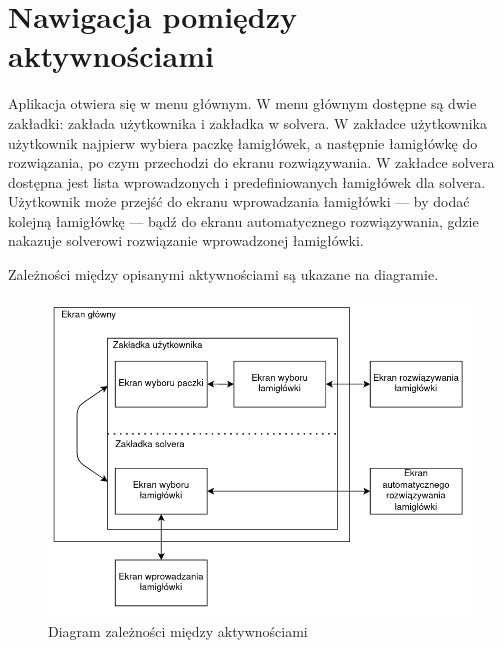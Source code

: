 \section{Nawigacja pomiędzy aktywnościami}
    Aplikacja otwiera się w menu głównym. W menu głównym dostępne są dwie zakładki: zakłada użytkownika
i zakładka w solvera. W zakładce użytkownika użytkownik najpierw wybiera paczkę łamigłówek, a
następnie łamigłówkę do rozwiązania, po czym przechodzi do ekranu rozwiązywania. W zakładce solvera
dostępna jest lista wprowadzonych i predefiniowanych łamigłówek dla solvera. Użytkownik może przejść
do ekranu wprowadzania łamigłówki — by dodać kolejną łamigłówkę — bądź do ekranu automatycznego rozwiązywania,
gdzie nakazuje solverowi rozwiązanie wprowadzonej łamigłówki.

    Zależności między opisanymi aktywnościami są ukazane na diagramie.

\begin{figure}[!htb]
    \centering
    \includegraphics[width=\textwidth]{images/screens_diagram.png}
    \caption{Diagram zależności między aktywnościami}
    \label{diagAktywnosci}
\end{figure}
